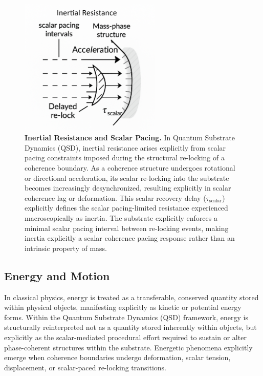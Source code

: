\documentclass[preprints,article,submit,pdftex,moreauthors]{Definitions/mdpi}
\begin{document}
\begin{figure}[H]
    \centering
    \includegraphics[width=0.6\textwidth]{figures/inertia.png}
    \caption{
    \textbf{Inertial Resistance and Scalar Pacing.}
    In Quantum Substrate Dynamics (QSD), inertial resistance arises explicitly from scalar pacing constraints imposed during the structural re-locking of a coherence boundary. As a coherence structure undergoes rotational or directional acceleration, its scalar re-locking into the substrate becomes increasingly desynchronized, resulting explicitly in scalar coherence lag or deformation. This scalar recovery delay (\(\tau_{\text{scalar}}\)) explicitly defines the scalar pacing-limited resistance experienced macroscopically as inertia. The substrate explicitly enforces a minimal scalar pacing interval between re-locking events, making inertia explicitly a scalar coherence pacing response rather than an intrinsic property of mass.
    }
    \label{fig:inertial-resistance}
\end{figure}

\subsection{Energy and Motion}

In classical physics, energy is treated as a transferable, conserved quantity stored within physical objects, manifesting explicitly as kinetic or potential energy forms. Within the Quantum Substrate Dynamics (QSD) framework, energy is structurally reinterpreted not as a quantity stored inherently within objects, but explicitly as the scalar-mediated procedural effort required to sustain or alter phase-coherent structures within the substrate. Energetic phenomena explicitly emerge when coherence boundaries undergo deformation, scalar tension, displacement, or scalar-paced re-locking transitions.
\end{document}
